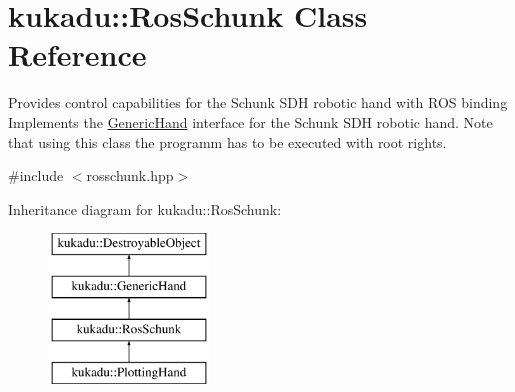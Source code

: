 \hypertarget{classkukadu_1_1RosSchunk}{\section{kukadu\-:\-:Ros\-Schunk Class Reference}
\label{classkukadu_1_1RosSchunk}
}


Provides control capabilities for the Schunk S\-D\-H robotic hand with R\-O\-S binding Implements the \hyperlink{classkukadu_1_1GenericHand}{Generic\-Hand} interface for the Schunk S\-D\-H robotic hand. Note that using this class the programm has to be executed with root rights.  




{\ttfamily \#include $<$rosschunk.\-hpp$>$}

Inheritance diagram for kukadu\-:\-:Ros\-Schunk\-:\begin{figure}[H]
\begin{center}
\leavevmode
\includegraphics[height=4.000000cm]{classkukadu_1_1RosSchunk}
\end{center}
\end{figure}
